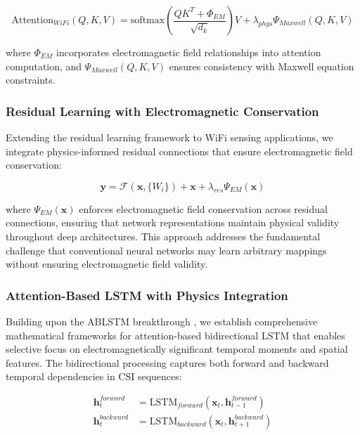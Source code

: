 \documentclass[journal]{IEEEtran}
\begin{document}
\begin{equation}
\text{Attention}_{WiFi}(Q,K,V) = \text{softmax}\left(\frac{QK^T + \Phi_{EM}}{\sqrt{d_k}}\right)V + \lambda_{phys} \Psi_{Maxwell}(Q,K,V)
\label{eq:vit_physics_attention}
\end{equation}

where $\Phi_{EM}$ incorporates electromagnetic field relationships into attention computation, and $\Psi_{Maxwell}(Q,K,V)$ ensures consistency with Maxwell equation constraints.

\subsubsection{Residual Learning with Electromagnetic Conservation}

Extending the residual learning framework \cite{he2016deep} to WiFi sensing applications, we integrate physics-informed residual connections that ensure electromagnetic field conservation:

\begin{equation}
\mathbf{y} = \mathcal{F}(\mathbf{x}, \{W_i\}) + \mathbf{x} + \lambda_{res} \Psi_{EM}(\mathbf{x})
\label{eq:resnet_physics}
\end{equation}

where $\Psi_{EM}(\mathbf{x})$ enforces electromagnetic field conservation across residual connections, ensuring that network representations maintain physical validity throughout deep architectures. This approach addresses the fundamental challenge that conventional neural networks may learn arbitrary mappings without ensuring electromagnetic field validity.

\subsubsection{Attention-Based LSTM with Physics Integration}

Building upon the ABLSTM breakthrough \cite{chen2018wifi}, we establish comprehensive mathematical frameworks for attention-based bidirectional LSTM that enables selective focus on electromagnetically significant temporal moments and spatial features. The bidirectional processing captures both forward and backward temporal dependencies in CSI sequences:

\begin{align}
\mathbf{h}_t^{forward} &= \text{LSTM}_{forward}(\mathbf{x}_t, \mathbf{h}_{t-1}^{forward}) \label{eq:ablstm_forward} \\
\mathbf{h}_t^{backward} &= \text{LSTM}_{backward}(\mathbf{x}_t, \mathbf{h}_{t+1}^{backward}) \label{eq:ablstm_backward}
\end{align}
\end{document}
